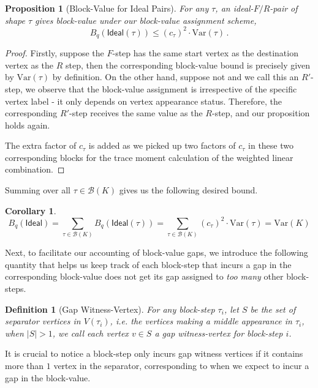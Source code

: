 \documentclass[12pt]{article}
\newcommand{\Var}{\mathrm{Var}}
\newtheorem{proposition}[theorem]{Proposition}
\newtheorem{corollary}[theorem]{Corollary}
\newtheorem{definition}[theorem]{Definition}
\newcommand{\calB}{\mathcal{B}}
\begin{document}
\begin{proposition}[Block-Value for Ideal Pairs]
	For any $\tau$, an ideal-$F/R$-pair of shape $\tau$ gives block-value under our block-value assignment scheme, \[ 
	B_q(\mathsf{Ideal}(\tau) ) \leq (c_\tau)^2 \cdot \Var(\tau)\,. 
	\]
\end{proposition}
\begin{proof}
	Firstly, suppose the $F$-step has the same start vertex as the destination vertex as the $R$ step, then the corresponding block-value bound is precisely given by $\Var(\tau)$ by definition. On the other hand, suppose not and we call this an $R'$-step, we observe that the block-value assignment is irrespective of the specific vertex label - it only depends on vertex appearance status. Therefore, the corresponding $R'$-step receives the same value as the $R$-step, and our proposition holds again. 
	
	The extra factor of $c_\tau$ is added as we picked up two factors of $c_\tau$ in these two corresponding blocks for the trace moment calculation of the weighted linear combination.
\end{proof}
Summing over all $\tau\in \calB(K)$ gives us the following desired bound.
\begin{corollary}
	\[ 
	B_q(\mathsf{Ideal}) = \sum_{\tau \in \calB(K)} B_q(\mathsf{Ideal}(\tau) ) = \sum_{\tau\in\calB(K)} (c_\tau)^2 \cdot \Var(\tau) = \Var(K)
	\]
\end{corollary}

Next, to facilitate our accounting of block-value gaps, we introduce the following quantity that helps us keep track of each block-step that incurs a gap in the corresponding block-value does not get its gap assigned to \emph{too many} other block-steps.
\begin{definition}[Gap Witness-Vertex]
	For any block-step $\tau_i$, let $S$ be the set of separator vertices in $V(\tau_i)$, i.e. the vertices making a middle appearance in $\tau_i$, when $|S|>1$, we call each vertex $v\in S$ a gap witness-vertex for block-step $i$.
\end{definition}

	It is crucial to notice a block-step only incurs gap witness vertices if it contains more than $1$ vertex in the separator, corresponding to when we expect to incur a gap in the block-value.
\end{document}
